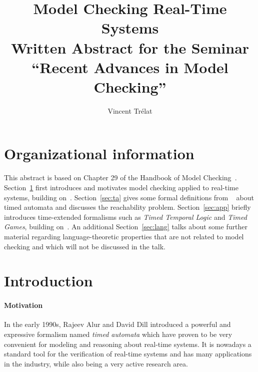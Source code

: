 \documentclass[11pt]{article}
\title{Model Checking Real-Time Systems\\\small Written Abstract for the Seminar ``Recent Advances in Model Checking''}
\author{Vincent Trélat}
\date{}
\theoremstyle{definition}
\theoremstyle{remark}
\theoremstyle{definition}
\begin{document}
\maketitle	

\section*{Organizational information}
This abstract is based on Chapter 29 of the Handbook of Model Checking~\cite{handbook}.
Section~\ref{sec:intro} first introduces and motivates model checking applied to real-time systems, building on~\cite[Chapters~29.1 and 29.2]{handbook}.
Section~\ref{sec:ta} gives some formal definitions from ~\cite[Chapters~29.2 and 29.7]{handbook} about timed automata and discusses the reachability problem.
Section~\ref{sec:app} briefly introduces time-extended formalisms such as \emph{Timed Temporal Logic} and \emph{Timed Games}, building on~\cite[Chapters~29.6~and~29.9]{handbook}.
An additional Section~\ref{sec:lang} talks about some further material regarding language-theoretic properties that are not related to model checking and which will not be discussed in the talk.

\section{Introduction}\label{sec:intro}
\paragraph{Motivation} In the early 1990s, Rajeev Alur and David Dill introduced a powerful and expressive formalism named \emph{timed automata} which have proven to be very convenient for modeling and reasoning about real-time systems.
It is nowadays a standard tool for the verification of real-time systems and has many applications in the industry, while also being a very active research area.
\end{document}
